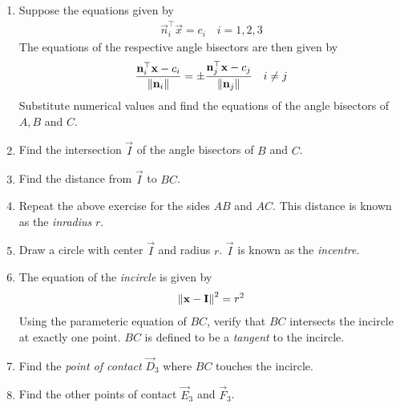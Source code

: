 \begin{enumerate}[label=\thesection.\arabic*.,ref=\thesection.\theenumi]
\item Suppose the equations  given by 
		\begin{align}
			\label{eq:tri-sides}
			\vec{n}_i^{\top}\vec{x}=c_i \quad i = 1, 2, 3 
		\end{align}
		The equations of the respective angle bisectors are then given by 
		\begin{align}
			\frac{\mathbf{n}_i^{\top}\mathbf{x}-c_i}{\left\lVert\mathbf{n}_i\right\rVert}
		=
	\pm	\frac{\mathbf{n}_j^{\top}\mathbf{x}-c_j}{\left\lVert\mathbf{n}_j\right\rVert}
\quad i \ne j
		\end{align}
		Substitute numerical values and find the equations of the angle bisectors of $A, B$ and $C$.
	\\
  
	\item Find the intersection $\vec{I}$ of the angle bisectors of $B$ and $C$.
	\item Find the distance from $\vec{I}$ to $BC$.  
  \\
		 
	\item Repeat the above exercise for the sides $AB$ and $AC$.
	This distance is known as the {\em inradius} $r$.
	\item Draw a circle with center $\vec{I}$ and radius $r$.  $\vec{I}$ is known as the {\em incentre}.
	\item The equation of the {\em incircle} is given by 
		\begin{align}
			\label{eq:incircle}
			\norm{\vec{x}-\vec{I}}^2 = r^2
		\end{align}
		Using the parameteric equation of $BC$, verify that $BC$ intersects the incircle at exactly one point. $BC$ is defined to be a {\em tangent} to the incircle.
		\\
		
	\item Find the {\em point of contact} $\vec{D}_3$ where $BC$ touches the incircle.
		\\
		

  \item Find the other points of contact $\vec{E}_3$ and $\vec{F}_3$.
  \\
		
		\fi
\end{enumerate}
